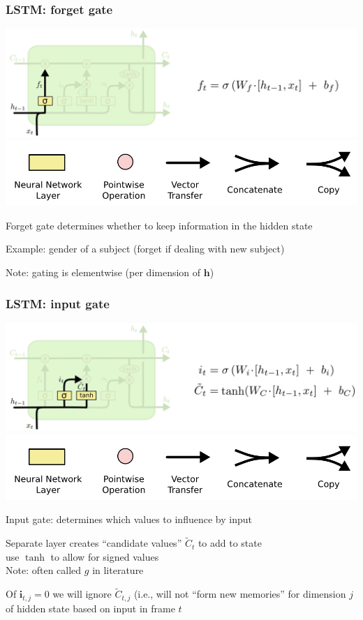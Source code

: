 \documentclass[xcolor=dvipsnames]{beamer}
\begin{document}
\begin{frame}
  \frametitle{LSTM: forget gate}
  \includegraphics[width=.9\textwidth]{olah-lstm/LSTM3-focus-f}\\
\includegraphics[width=.5\textwidth]{olah-lstm/LSTM2-notation}
\bi
\item Forget gate determines whether to keep information in the hidden
  state
\item Example: gender of a subject (forget if dealing with new
  subject)
\item Note: gating is elementwise (per dimension of $\mathbf{h}$)
\ei
\end{frame}

\begin{frame}
  \frametitle{LSTM: input gate}
  \includegraphics[width=.9\textwidth]{olah-lstm/LSTM3-focus-i}\\
\includegraphics[width=.5\textwidth]{olah-lstm/LSTM2-notation}
\bi
\item Input gate: determines which values to influence by input
\item Separate layer creates ``candidate values'' $\tilde{C}_t$ to add
  to state\\
use $\tanh$ to allow for signed values\\
Note: often called $g$ in literature
\item Of $\mathbf{i}_{t,j}=0$ we will ignore $\tilde{C}_{t,j}$ (i.e.,
  will not ``form new memories'' for dimension $j$ of hidden state
  based on input in frame $t$
\ei
\end{frame}
\end{document}
